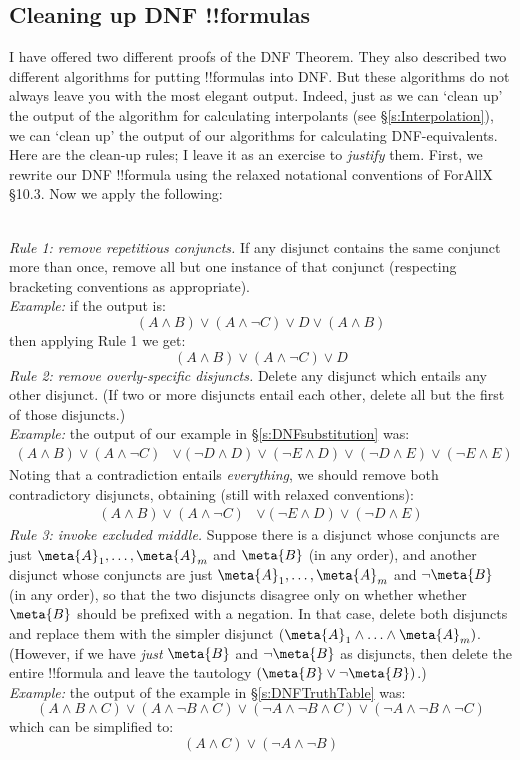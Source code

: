 \documentclass[../../../include/open-logic-section]{subfiles}
\begin{document}
\subsection{Cleaning up DNF !!{formula}s}\label{s:DNFCleanUp}
I have offered two different proofs of the DNF Theorem. They also described two different algorithms for putting !!{formula}s into DNF. But these algorithms do not always leave you with the most elegant output. Indeed, just as we can `clean up' the output of the algorithm for calculating interpolants (see \S\ref{s:Interpolation}), we can `clean up' the output of our algorithms for calculating DNF-equivalents. Here are the clean-up rules; I leave it as an exercise to \emph{justify} them. First, we rewrite our DNF !!{formula} using the relaxed notational conventions of ForAllX{} \S10.3. Now we apply the following:

\
\\\emph{Rule 1: remove repetitious conjuncts.}  If any disjunct contains the same conjunct more than once, remove all but one instance of that conjunct (respecting bracketing conventions as appropriate).
\\\emph{Example:} if the output is:
$$(A \land B) \lor (A \land \lnot C) \lor D \lor (A \land B)$$
then applying Rule 1 we get:
$$(A \land B) \lor (A \land \lnot C) \lor D$$
\noindent \emph{Rule 2: remove overly-specific disjuncts.} Delete any disjunct which entails any other disjunct. (If two or more disjuncts entail each other, delete all but the first of those disjuncts.)
\\\emph{Example:} the output of our example in \S\ref{s:DNFsubstitution} was:
		\begin{align*}
		(A \land B) \lor (A \land \lnot C) &\lor  (\lnot D \land D) \lor (\lnot E \land D) \lor (\lnot D \land E) \lor (\lnot E \land  E)		
		\end{align*}
		Noting that a contradiction entails \emph{everything}, we should remove both contradictory disjuncts, obtaining (still with relaxed conventions):
		\begin{align*}
		(A \land B) \lor (A \land \lnot C) &\lor  (\lnot E \land D) \lor (\lnot D \land E)
		\end{align*}		
\emph{Rule 3: invoke excluded middle.} Suppose there is a disjunct whose conjuncts are just $\meta{A}_1, \ldots,  \meta{A}_m$ and $\meta{B}$ (in any order), and another disjunct whose conjuncts are just $\meta{A}_1, \ldots, \meta{A}_m$ and $\lnot \meta{B}$ (in any order), so that the two disjuncts disagree only on whether whether $\meta{B}$ should be prefixed with a negation. In that case, delete both disjuncts and replace them with the simpler disjunct $(\meta{A}_1 \land \ldots \land \meta{A}_m)$. (However, if we have \emph{just} $\meta{B}$ and $\lnot\meta{B}$ as disjuncts, then delete the entire !!{formula} and leave the tautology $(\meta{B} \lor \lnot \meta{B})$.)
\\\emph{Example:} the output of the example in \S\ref{s:DNFTruthTable} was:
		$$(A \land B \land C) \lor (A \land \lnot B \land C) \lor (\lnot A \land \lnot B \land C) \lor (\lnot A \land \lnot B \land \lnot C)$$
			which can be simplified to:
		$$(A \land C) \lor (\lnot A \land \lnot B)$$
\end{document}
